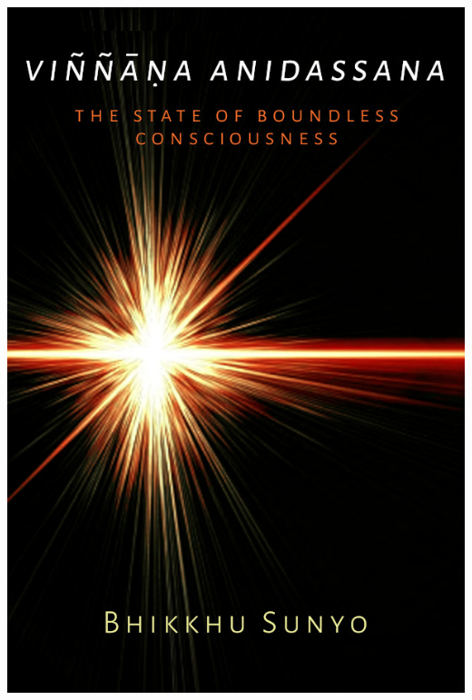 \documentclass[10pt, openright]{book}
\begin{document}
\frontmatter

\pagestyle{empty}

\includegraphics[scale= 2, trim= 0 0 0 0]{../_resources/book-data/vasy/FrontLarge.jpg}

\newpage~\newpage~
\end{document}
